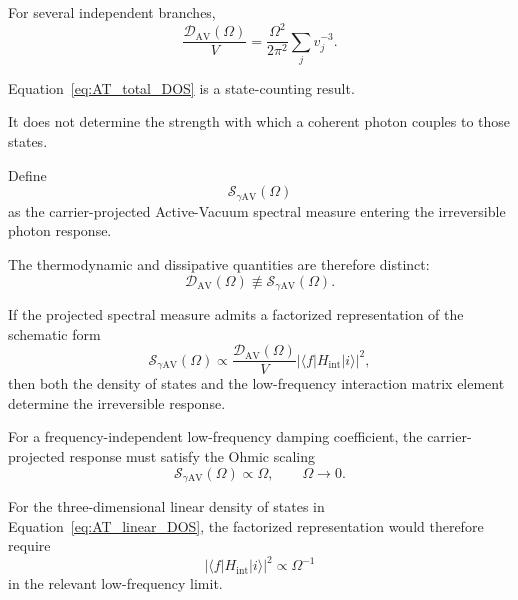 For several independent branches,
\begin{equation}
    \frac{\mathcal D_{\mathrm{AV}}(\Omega)}{V}
    =
    \frac{\Omega^2}{2\pi^2}
    \sum_j
    v_j^{-3}.
    \label{eq:AT_total_DOS}
\end{equation}

Equation~\eqref{eq:AT_total_DOS}
is a state-counting result.

It does not determine the strength with which a coherent photon couples to
those states.

Define
\begin{equation}
    \mathcal S_{\gamma\mathrm{AV}}(\Omega)
\end{equation}
as the carrier-projected Active-Vacuum spectral measure entering the
irreversible photon response.

The thermodynamic and dissipative quantities are therefore distinct:
\begin{equation}
    \mathcal D_{\mathrm{AV}}(\Omega)
    \not\equiv
    \mathcal S_{\gamma\mathrm{AV}}(\Omega).
    \label{eq:AT_DOS_spectral_distinction}
\end{equation}

If the projected spectral measure admits a factorized representation of the
schematic form
\begin{equation}
    \mathcal S_{\gamma\mathrm{AV}}(\Omega)
    \propto
    \frac{\mathcal D_{\mathrm{AV}}(\Omega)}{V}
    \left|
        \langle f|
        H_{\mathrm{int}}
        |i\rangle
    \right|^2,
    \label{eq:AT_projected_spectrum}
\end{equation}
then both the density of states and the low-frequency interaction matrix
element determine the irreversible response.

For a frequency-independent low-frequency damping coefficient, the
carrier-projected response must satisfy the Ohmic scaling
\begin{equation}
    \mathcal S_{\gamma\mathrm{AV}}(\Omega)
    \propto
    \Omega,
    \qquad
    \Omega\rightarrow0.
    \label{eq:AT_ohmic_requirement}
\end{equation}

For the three-dimensional linear density of states in
Equation~\eqref{eq:AT_linear_DOS},
the factorized representation would therefore require
\begin{equation}
    \left|
        \langle f|
        H_{\mathrm{int}}
        |i\rangle
    \right|^2
    \propto
    \Omega^{-1}
    \label{eq:AT_linear_vertex_requirement}
\end{equation}
in the relevant low-frequency limit.

